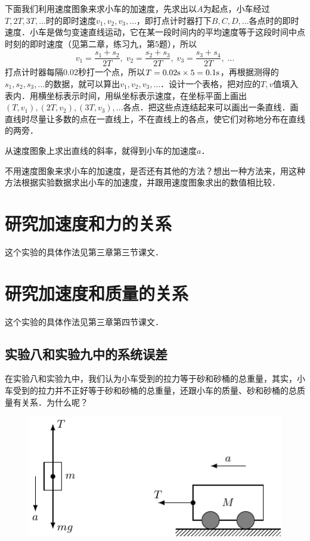 下面我们利用速度图象来求小车的加速度，先求出以$A$为起点，小车经过$T,2T,3T,\ldots$时的即时速度$v_1,v_2,v_3,\ldots$，即打点计时器打下$B,C,D,\ldots$各点时的即时速度．小车是做匀变速直线运动，它在某一段时间内的平均速度等于这段时间中点时刻的即时速度（见第二章，练习九，第5题），所以
\[v_1=\frac{s_1+s_2}{2T},\; v_2=\frac{s_2+s_3}{2T},\;v_3=\frac{s_3+s_4}{2T},\; \ldots\]
打点计时器每隔0.02秒打一个点，所以$T=0.02{\rm s}\times 5=0.1{\rm s}$，再根据测得的$s_1,s_2,s_3,\ldots$的数据，就可以算出$v_1,v_2,v_3,\ldots$．设计一个表格，把对应的$T,v$值填入表内．用横坐标表示时间，用纵坐标表示速度，在坐标平面上画出$(T,v_1),(2T,v_2),(3T,v_3),\ldots$各点．把这些点连结起来可以画出一条直线．画直线时尽量让多数的点在一直线上，不在直线上的各点，使它们对称地分布在直线的两旁．

从速度图象上求出直线的斜率，就得到小车的加速度$a$．

不用速度图象来求小车的加速度，是否还有其他的方法？想出一种方法来，用这种方法根据实验数据求出小车的加速度，并跟用速度图象求出的数值相比较．

\section{研究加速度和力的关系}
这个实验的具体作法见第三章第三节课文．

\section{研究加速度和质量的关系}
这个实验的具体作法见第三章第四节课文．

\subsection*{实验八和实验九中的系统误差}
在实验八和实验九中，我们认为小车受到的拉力等于砂和砂桶的总重量，其实，小车受到的拉力并不正好等于砂和砂桶的总重量，还跟小车的质量、砂和砂桶的总质量有关系．为什么呢？

\begin{figure}[htbp]
    \centering
    \includegraphics{fig/A/10-11.pdf}
    \caption{}\label{fig_A_10-11}
\end{figure}

